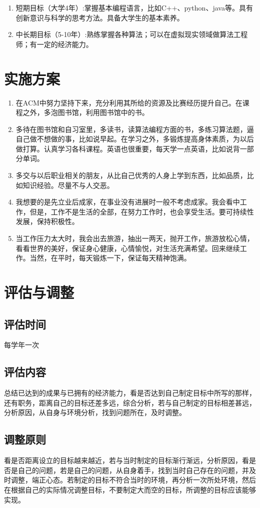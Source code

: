 \documentclass{article}
\begin{document}
\begin{enumerate}[(1)]
	\item 短期目标（大学4年）:掌握基本编程语言，比如C++、python、java等。具有创新意识与科学的思考方法。具备大学生的基本素养。\par
	\item 中长期目标（5-10年）:熟练掌握各种算法；可以在虚拟现实领域做算法工程师；有一定的经济能力。\par
\end{enumerate}



\section{实施方案}
\par
\begin{enumerate}[1、]
	\item 在ACM中努力坚持下来，充分利用其所给的资源及比赛经历提升自己。在课程之外，多泡图书馆，利用图书馆中的书。\par
	\item 多待在图书馆和自习室里，多读书，读算法编程方面的书，多练习算法题，逼自己做不想做的事，比如说早起。在学习之外，多锻炼提高身体素质，为以后做打算。认真学习各科课程。英语也很重要，每天学一点英语，比如说背一部分单词。\par
	\item 多交与以后职业相关的朋友，从比自己优秀的人身上学到东西，比如品质，比如知识经验。尽量不与人交恶。\par
	\item 我想要的是先立业后成家，在事业没有进展时一般不考虑成家。我会看中工作，但是，工作不是生活的全部，在努力工作时，也会享受生活。要可持续性发展，保持积极性。\par
	\item 当工作压力太大时，我会出去旅游，抽出一两天，抛开工作，旅游放松心情，看看世界的美好，保证身心健康，心情愉悦，对生活充满希望。回来继续工作。当然，在平时，每天锻炼一下，保证每天精神饱满。\par
\end{enumerate}
\par 

\section{评估与调整}
\par 
\subsection{评估时间}
每学年一次\par
\subsection{评估内容}
总结已达到的成果与已拥有的经济能力，看是否达到自己制定目标中所写的那样，还有职务，距离自己的目标还差多远，综合分析，若与自己制定的目标相差甚远，分析原因，从自身与环境分析，找到问题所在，及时调整。\par
\subsection{调整原则}
看是否距离设立的目标越来越近，若与当时制定的目标渐行渐远，分析原因，看是否是自己的问题，若是自己的问题，从自身着手，找到当时自己存在的问题，并及时调整，端正心态。若制定的目标不符合当时的环境，再分析一次所处环境，然后在根据自己的实际情况调整目标，不要制定大而空的目标，所调整的目标应该能够实现。\par
\end{document}
